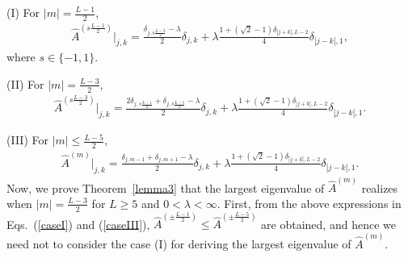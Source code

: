 \documentclass[prl,twocolumn,superscriptaddress,nofootinbib]{revtex4}
\begin{document}
\begin{widetext}
      (I) For $|m|=\frac{L-1}{2}$, 
\begin{align}
  \hat{A}^{(s\frac{L-1}{2})}|_{j,k}=\frac{\delta_{j,s\frac{L-3}{2}}-\lambda}{2}\delta_{j,k}+
  \lambda\frac{1+(\sqrt{2}-1)\delta_{|j+k|,L-2}}{4}\delta_{|j-k|,1},
  \label{caseI}
\end{align}  
where $s\in\{-1,1\}$. 

(II) For $|m|=\frac{L-3}{2}$, 
\begin{align}
  \hat{A}^{(s\frac{L-3}{2})}|_{j,k}=
  \frac{2\delta_{j,s\frac{L-1}{2}}+\delta_{j,s\frac{L-5}{2}}-\lambda}{2}\delta_{j,k}+
  \lambda\frac{1+(\sqrt{2}-1)\delta_{|j+k|,L-2}}{4}\delta_{|j-k|,1}.
    \label{caseII}
\end{align}  

(III) For $|m|\leq \frac{L-5}{2}$, 
\begin{align}
  \hat{A}^{(m)}|_{j,k}=
  \frac{\delta_{j,m-1}+\delta_{j,m+1}-\lambda}{2}\delta_{j,k}+
  \lambda\frac{1+(\sqrt{2}-1)\delta_{|j+k|,L-2}}{4}\delta_{|j-k|,1}.
    \label{caseIII}
\end{align}  
Now, we prove Theorem~\ref{lemma3} that the largest eigenvalue of $\hat{A}^{(m)}$ realizes when $|m|=\frac{L-3}{2}$ 
for $L\geq5$ and $0<\lambda<\infty$. 
First, from the above expressions in Eqs.~(\ref{caseI}) and (\ref{caseIII}),
$\hat{A}^{(\pm\frac{L-1}{2})}\leq \hat{A}^{(\pm\frac{L-5}{2})}$ are obtained, and 
hence we need not to consider the case (I) for deriving the largest eigenvalue of $\hat{A}^{(m)}$. 


\end{widetext}
\end{document}
